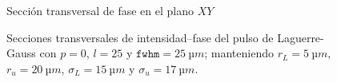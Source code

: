 \begin{figure}[htbp]
\begin{subcaptionblock}{.4\textwidth}
    \caption{Sección transversal de fase en el plano $XY$}\label{fig:ch4_ase4}
  \end{subcaptionblock}
   \caption{Secciones transversales de intensidad--fase del pulso de Laguerre-Gauss con $p=0$, $l=25$ y $\texttt{fwhm}=\qty{25}{µm}$; manteniendo $r_{L}=\qty{5}{µm}$, $r_{u}=\qty{20}{µm}$, $\sigma_{L}=\qty{15}{µm}$ y $\sigma_{u}=\qty{17}{µm}$.}
   \label{fig:4.39}
\end{figure}
